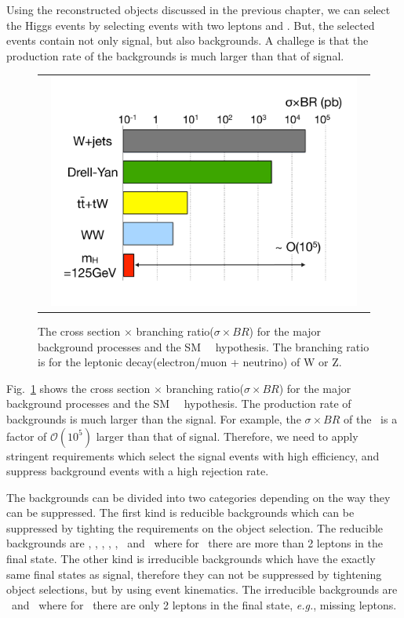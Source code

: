 Using the reconstructed objects discussed in the previous chapter, 
we can select the Higgs events by selecting events with two leptons 
and \met. But, the selected events contain not only signal, 
but also backgrounds. A challege is that the production rate 
of the backgrounds is much larger than that of signal. 
\begin{figure}[htp] 
\centering 
\begin{tabular}{c} 
\includegraphics[width=0.95\textwidth]{figures/BkgProdRate.pdf} 
\end{tabular} 
\caption{The cross section $\times$
branching ratio($\sigma \times BR$) for the major background
processes and the SM ~\GeV\ hypothesis. The branching ratio
is for the leptonic decay(electron/muon + neutrino) of W or Z.} 
\label{fig:bkgprodrate} 
\end{figure} 
Fig.~\ref{fig:bkgprodrate} shows the cross section $\times$ 
branching ratio($\sigma \times BR$) for the major background 
processes and the SM ~\GeV\ hypothesis. 
The production rate of backgrounds is much larger than the signal. 
For example, the $\sigma \times BR$ of the \Wjets\ is a factor of 
$\mathcal{O}(10^5)$ larger than that of signal.  
Therefore, we need to apply stringent requirements which 
select the signal events with high efficiency, and suppress 
background events with a high rejection rate.  

The backgrounds can be divided into two categories depending on 
the way they can be suppressed. The first kind is reducible 
backgrounds which can be suppressed by tighting the requirements 
on the object selection. The reducible backgrounds are 
\dyll, \topbkg, \Wjets, \wgamma, \wgammastar, \vv\ and \ztt\
where for \vv\ there are more than 2 leptons in the final state.  
The other kind is irreducible backgrounds 
which have the exactly same final states as signal, 
therefore they can not be suppressed by tightening object selections,  
but by using event kinematics. The irreducible backgrounds 
are \ww\ and \vv\ where for \vv\ there are only 2 leptons 
in the final state, \textit{e.g.}, missing leptons. 

